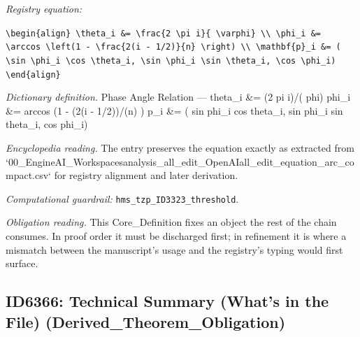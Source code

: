 \documentclass[11pt]{article}
\theoremstyle{remark}
\begin{document}
\noindent\textit{Registry equation:}\par
{\small\texttt{\textbackslash{}begin\{align\} \textbackslash{}theta\_i \&= \textbackslash{}frac\{2 \textbackslash{}pi i\}\{ \textbackslash{}varphi\} \textbackslash{}\textbackslash{} \textbackslash{}phi\_i \&= \textbackslash{}arccos \textbackslash{}left(1 - \textbackslash{}frac\{2(i - 1/2)\}\{n\} \textbackslash{}right) \textbackslash{}\textbackslash{} \textbackslash{}mathbf\{p\}\_i \&= ( \textbackslash{}sin \textbackslash{}phi\_i \textbackslash{}cos \textbackslash{}theta\_i, \textbackslash{}sin \textbackslash{}phi\_i \textbackslash{}sin \textbackslash{}theta\_i, \textbackslash{}cos \textbackslash{}phi\_i) \textbackslash{}end\{align\}}}\par\medskip
\noindent\textit{Dictionary definition.} Phase Angle Relation --- theta\_i \&= (2 pi i)/( phi) phi\_i \&= arccos (1 - (2(i - 1/2))/(n) ) p\_i \&= ( sin phi\_i cos theta\_i, sin phi\_i sin theta\_i, cos phi\_i)\par\medskip
\noindent\textit{Encyclopedia reading.} The entry preserves the equation exactly as extracted from `00\_EngineAI\_Workspacesanalysis\_all\_edit\_OpenAIall\_edit\_equation\_arc\_compact.csv` for registry alignment and later derivation.
\par\medskip\noindent\textit{Computational guardrail:} \texttt{hms\_tzp\_ID3323\_threshold}.
\par\medskip\noindent\textit{Obligation reading.} This Core\_Definition fixes an object the rest of the chain consumes. In proof order it must be discharged first; in refinement it is where a mismatch between the manuscript's usage and the registry's typing would first surface.

\subsection{ID6366: Technical Summary (What's in the File) (Derived\_Theorem\_Obligation)}
\end{document}
